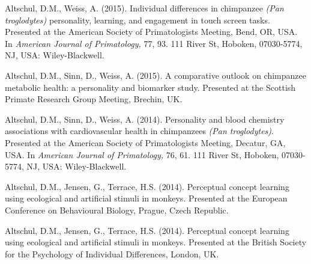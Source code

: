 \documentclass[margin,line]{res}
\begin{document}
\begin{resume}
Altschul, D.M., Weiss, A. (2015). Individual differences in chimpanzee {\it (Pan troglodytes)} personality, learning, and engagement in touch screen tasks. Presented at the American Society of Primatologists Meeting, Bend, OR, USA. In {\it American Journal of Primatology,} 77, 93. 111 River St, Hoboken, 07030-5774, NJ, USA: Wiley-Blackwell.

Altschul, D.M., Sinn, D., Weiss, A. (2015). A comparative outlook on chimpanzee metabolic health: a personality and biomarker study. Presented at the Scottish Primate Research Group Meeting, Brechin, UK.

Altschul, D.M., Sinn, D., Weiss, A. (2014).  Personality and blood chemistry associations with cardiovascular health in chimpanzees {\it (Pan troglodytes)}. Presented at the American Society of Primatologists Meeting, Decatur, GA, USA. In {\it American Journal of Primatology,} 76, 61. 111 River St, Hoboken, 07030-5774, NJ, USA: Wiley-Blackwell.

Altschul, D.M., Jensen, G., Terrace, H.S. (2014). Perceptual concept learning using ecological and artificial stimuli in monkeys. Presented at the European Conference on Behavioural Biology, Prague, Czech Republic.

Altschul, D.M., Jensen, G., Terrace, H.S. (2014). Perceptual concept learning using ecological and artificial stimuli in monkeys. Presented at the British Society for the Psychology of Individual Differences, London, UK.


\end{resume}
\end{document}
